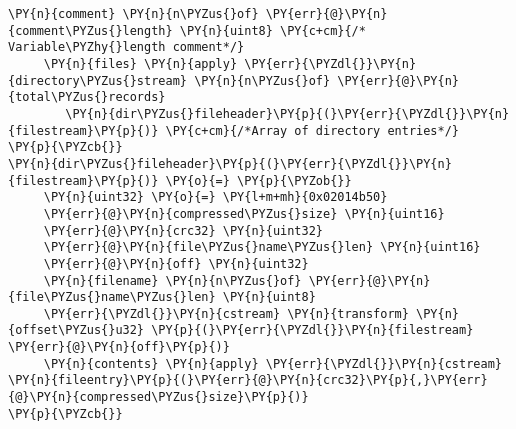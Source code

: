 \begin{Verbatim}[commandchars=\\\{\},codes={\catcode`\$=3\catcode`\^=7\catcode`\_=8}]
     \PY{n}{comment} \PY{n}{n\PYZus{}of} \PY{err}{@}\PY{n}{comment\PYZus{}length} \PY{n}{uint8} \PY{c+cm}{/* Variable\PYZhy{}length comment*/}
     \PY{n}{files} \PY{n}{apply} \PY{err}{\PYZdl{}}\PY{n}{directory\PYZus{}stream} \PY{n}{n\PYZus{}of} \PY{err}{@}\PY{n}{total\PYZus{}records} 
        \PY{n}{dir\PYZus{}fileheader}\PY{p}{(}\PY{err}{\PYZdl{}}\PY{n}{filestream}\PY{p}{)} \PY{c+cm}{/*Array of directory entries*/}
\PY{p}{\PYZcb{}}
\PY{n}{dir\PYZus{}fileheader}\PY{p}{(}\PY{err}{\PYZdl{}}\PY{n}{filestream}\PY{p}{)} \PY{o}{=} \PY{p}{\PYZob{}} 
     \PY{n}{uint32} \PY{o}{=} \PY{l+m+mh}{0x02014b50}
     \PY{err}{@}\PY{n}{compressed\PYZus{}size} \PY{n}{uint16} 
     \PY{err}{@}\PY{n}{crc32} \PY{n}{uint32} 
     \PY{err}{@}\PY{n}{file\PYZus{}name\PYZus{}len} \PY{n}{uint16}
     \PY{err}{@}\PY{n}{off} \PY{n}{uint32}
     \PY{n}{filename} \PY{n}{n\PYZus{}of} \PY{err}{@}\PY{n}{file\PYZus{}name\PYZus{}len} \PY{n}{uint8}
     \PY{err}{\PYZdl{}}\PY{n}{cstream} \PY{n}{transform} \PY{n}{offset\PYZus{}u32} \PY{p}{(}\PY{err}{\PYZdl{}}\PY{n}{filestream} \PY{err}{@}\PY{n}{off}\PY{p}{)}
     \PY{n}{contents} \PY{n}{apply} \PY{err}{\PYZdl{}}\PY{n}{cstream} \PY{n}{fileentry}\PY{p}{(}\PY{err}{@}\PY{n}{crc32}\PY{p}{,}\PY{err}{@}\PY{n}{compressed\PYZus{}size}\PY{p}{)}
\PY{p}{\PYZcb{}}
\end{Verbatim}
